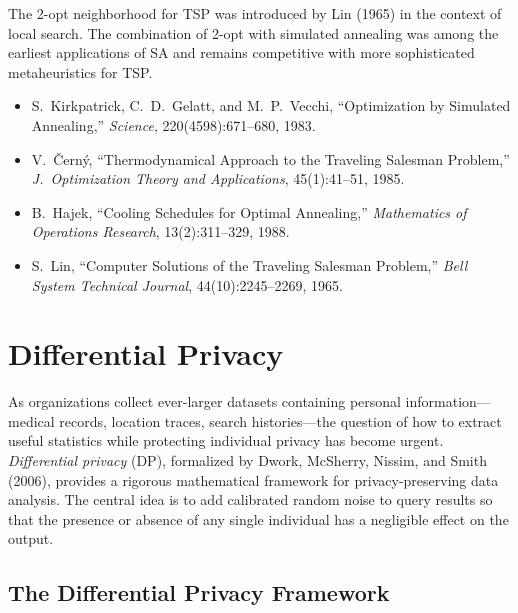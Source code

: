\documentclass[twoside,12pt]{book}
\theoremstyle{plain}
\theoremstyle{definition}
\theoremstyle{remark}
\begin{document}
The 2-opt neighborhood for TSP was introduced by Lin (1965) in the context of local search. The combination of 2-opt with simulated annealing was among the earliest applications of SA and remains competitive with more sophisticated metaheuristics for TSP.

\begin{itemize}[nosep]
  \item S.~Kirkpatrick, C.~D.~Gelatt, and M.~P.~Vecchi, ``Optimization by Simulated Annealing,'' \textit{Science}, 220(4598):671--680, 1983.
  \item V.~\v{C}ern\'{y}, ``Thermodynamical Approach to the Traveling Salesman Problem,'' \textit{J.~Optimization Theory and Applications}, 45(1):41--51, 1985.
  \item B.~Hajek, ``Cooling Schedules for Optimal Annealing,'' \textit{Mathematics of Operations Research}, 13(2):311--329, 1988.
  \item S.~Lin, ``Computer Solutions of the Traveling Salesman Problem,'' \textit{Bell System Technical Journal}, 44(10):2245--2269, 1965.
\end{itemize}

\chapter{Differential Privacy}
\label{ch:differential-privacy}

As organizations collect ever-larger datasets containing personal information---medical records, location traces, search histories---the question of how to extract useful statistics while protecting individual privacy has become urgent. \emph{Differential privacy} (DP), formalized by Dwork, McSherry, Nissim, and Smith (2006), provides a rigorous mathematical framework for privacy-preserving data analysis. The central idea is to add calibrated random noise to query results so that the presence or absence of any single individual has a negligible effect on the output.

\section{The Differential Privacy Framework}
\label{sec:dp-framework}
\end{document}
